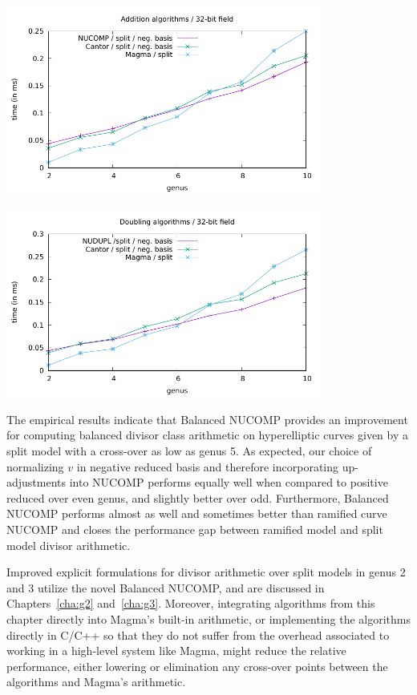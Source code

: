 \centerline{\includegraphics[width=0.775\textwidth]{balNucomp/add_lowg_32.pdf}}
\centerline{\includegraphics[width=0.775\textwidth]{balNucomp/dbl_lowg_32.pdf}}


The empirical results indicate that Balanced NUCOMP provides an improvement for
computing balanced divisor class arithmetic on hyperelliptic curves given by a
split model with a cross-over as low as genus 5.  As expected, our choice of
normalizing $v$ in negative reduced basis and therefore incorporating
up-adjustments into NUCOMP performs equally well when compared to positive
reduced over even genus, and slightly better over odd. Furthermore, Balanced
NUCOMP performs almost as well and sometimes better than ramified curve NUCOMP
and closes the performance gap between ramified model and split model divisor
arithmetic. 

Improved explicit formulations for divisor arithmetic over split models
in genus 2 and 3 utilize the novel Balanced NUCOMP, and are discussed in
Chapters~\ref{cha:g2} and~\ref{cha:g3}. Moreover, integrating algorithms from
this chapter directly into Magma's built-in arithmetic, or implementing the
algorithms directly in C/C++ so that they do not suffer from the overhead
associated to working in a high-level system like Magma, might reduce the
relative performance, either lowering or elimination any cross-over points
between the algorithms and Magma's arithmetic.

